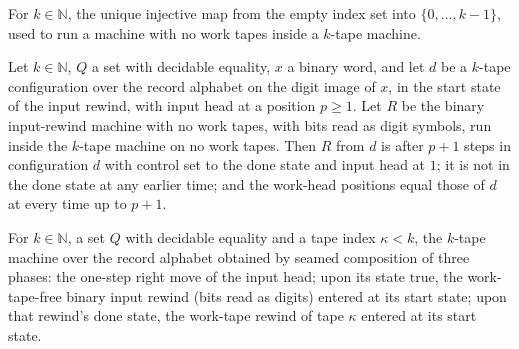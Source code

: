 \begin{definition}
\label{Complexity.sphEmptySel}
\leanok
For $k\in\mathbb{N}$, the unique injective map from the empty index set into $\{0,\dots,k-1\}$,
used to run a machine with no work tapes inside a $k$-tape machine.
\end{definition}

\begin{lemma}
\label{Complexity.sph_input_rewind_run}
\leanok
{}
Let $k\in\mathbb{N}$, $Q$ a set with decidable equality, $x$ a binary word, and let $d$ be a
$k$-tape configuration over the record alphabet on the digit image of $x$, in the start state of
the input rewind, with input head at a position $p\ge 1$. Let $R$ be the binary input-rewind
machine with no work tapes, with bits read as digit symbols, run inside the $k$-tape machine on
no work tapes. Then $R$ from $d$ is after $p+1$ steps in configuration $d$ with control set to the
done state and input head at $1$; it is not in the done state at any earlier time; and the
work-head positions equal those of $d$ at every time up to $p+1$.
\end{lemma}

\begin{definition}
\label{Complexity.sphRewindsTM}
\leanok
{}
For $k\in\mathbb{N}$, a set $Q$ with decidable equality and a tape index $\kappa<k$, the $k$-tape
machine over the record alphabet obtained by seamed composition of three phases: the one-step right
move of the input head; upon its state $\mathrm{true}$, the work-tape-free binary input rewind
(bits read as digits) entered at its start state; upon that rewind's done state, the work-tape
rewind of tape $\kappa$ entered at its start state.
\end{definition}

